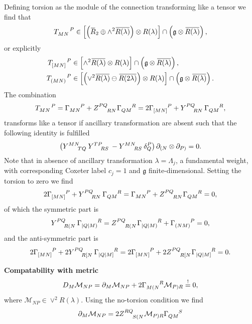 \documentclass{article}
\begin{document}
Defining torsion as the module of the connection transforming like a tensor we find that 
\begin{equation}
    \tensor{T}{_M_N^P}\in \left[\left(\overbar{R}_2\oplus \wedge^2\overbar{R(\lambda)}\right)\otimes R(\lambda)\right]\cap \left(\mathfrak{g}\otimes\overbar{R(\lambda)}\right),
\end{equation}
or explicitly 
\begin{align}
    \tensor{T}{_{[MN]}^P} &\in \left[\wedge^2\overbar{R(\lambda)}\otimes R(\lambda)\right]\cap \left(\mathfrak{g}\otimes\overbar{R(\lambda)}\right),\\
    \tensor{T}{_{(MN)}^P} &\in \left[\left(\vee^2\overbar{R(\lambda)}\ominus \overbar{R(2\lambda)}\right)\otimes R(\lambda)\right]\cap \left(\mathfrak{g}\otimes\overbar{R(\lambda)}\right).
\end{align}
The combination 
\begin{equation}
    \tensor{T}{_M_N^P} = \tensor{\Gamma}{_M_N^P}+\tensor{Z}{^P^Q_R_N}\tensor{\Gamma}{_Q_M^R} = 2\tensor{\Gamma}{_{[MN]}^P}+\tensor{Y}{^P^Q_R_N}\tensor{\Gamma}{_Q_M^R},
\end{equation}
transforms like a tensor if ancillary transformation are absent such that the following identity is fulfilled 
\begin{equation}
    \left(\tensor{Y}{^M^N_T_Q}\tensor{Y}{^T^P_R_S}-\tensor{Y}{^M^N_R_S}\delta^P_Q\right)\pd_{(N}\otimes\pd_{P)} = 0.
\end{equation}
Note that in absence of ancillary transformation $\lambda=\Lambda_j$, a fundamental weight, with corresponding Coxeter label $c_j=1$ and $\mathfrak{g}$ finite-dimensional.
Setting the torsion to zero we find 
\begin{equation}
    2\tensor{\Gamma}{_{[MN]}^P}+\tensor{Y}{^P^Q_R_N}\tensor{\Gamma}{_Q_M^R} = \tensor{\Gamma}{_{MN}^P}+\tensor{Z}{^P^Q_R_N}\tensor{\Gamma}{_Q_M^R}= 0,
\end{equation}
of which the symmetric part is 
\begin{equation}
    \tensor{Y}{^P^Q_R_{(N}}\tensor{\Gamma}{_{|Q|M)}^R} = \tensor{Z}{^P^Q_R_{(N}}\tensor{\Gamma}{_{|Q|M)}^R}+\tensor{\Gamma}{_{(NM)}^P} = 0,
\end{equation}
and the anti-symmetric part is 
\begin{equation}
    2\tensor{\Gamma}{_{[MN]}^P}+2\tensor{Y}{^P^Q_R_{[N}}\tensor{\Gamma}{_{|Q|M]}^R} = 2\tensor{\Gamma}{_{[MN]}^P}+2\tensor{Z}{^P^Q_R_{[N}}\tensor{\Gamma}{_{|Q|M]}^R} =0.
\end{equation}



\textbf{Compatability with metric}
\begin{equation}
    D_M\mathcal{M}_{NP} = \pd_M\mathcal{M}_{NP}+2\tensor{\Gamma}{_{M(N}^R}\mathcal{M}_{P)R}\overset{!}{=} 0,
\end{equation}
where $\mathcal{M}_{NP}\in \vee^2R(\lambda)$. Using the no-torsion condition we find 
\begin{equation}
    \pd_M\mathcal{M}_{NP} = 2\tensor{Z}{^{RQ}_{S(N}}\mathcal{M}_{P)R}\tensor{\Gamma}{_{QM}^S}
\end{equation}
\end{document}
